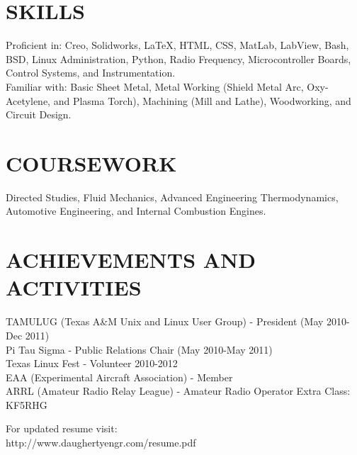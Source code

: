\documentclass{res}
\begin{document}
\begin{resume}
\newpage

\section{SKILLS}          
	Proficient in: Creo, Solidworks, \LaTeX{}, HTML, CSS, MatLab, LabView, Bash, BSD, Linux Administration, Python, Radio Frequency, Microcontroller Boards, Control Systems, and Instrumentation.\\
    Familiar with: Basic Sheet Metal, Metal Working (Shield Metal Arc, Oxy-Acetylene, and Plasma Torch), Machining (Mill and Lathe), Woodworking, and Circuit Design.

\section{COURSEWORK}
	Directed Studies, Fluid Mechanics, Advanced Engineering Thermodynamics, Automotive Engineering, and Internal Combustion Engines.


\section{ACHIEVEMENTS AND ACTIVITIES}
	TAMULUG (Texas A\&M Unix and Linux User Group) - President (May 2010-Dec 2011)\\
	Pi Tau Sigma - Public Relations Chair (May 2010-May 2011)\\
	Texas Linux Fest - Volunteer 2010-2012\\
    EAA (Experimental Aircraft Association) - Member\\
    ARRL (Amateur Radio Relay League) - Amateur Radio Operator Extra Class: KF5RHG 

    \begin{center}
        For updated resume visit:\\
        http://www.daughertyengr.com/resume.pdf
    \end{center}
\end{resume}
\end{document}
